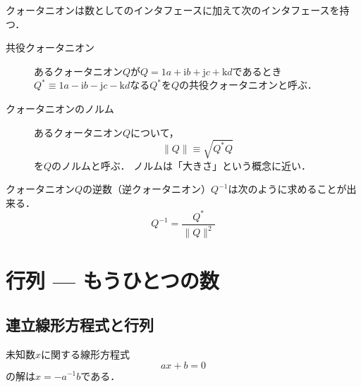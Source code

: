 \documentclass{jsbook}
\newcommand{\zero}{0}%
\newcommand{\one}{1}%
\newcommand{\ii}{\mathrm{i}}%
\newcommand{\jj}{\mathrm{j}}%
\newcommand{\kk}{\mathrm{k}}%
\newcommand{\norm}[1]{\|{#1}\|}
\begin{document}
クォータニオンは数としてのインタフェースに加えて次のインタフェースを持つ．
\begin{description}
\item[共役クォータニオン] あるクォータニオン$Q$が$Q=\one a+\ii b+\jj c+\kk d$であるとき$Q^*\equiv\one a-\ii b-\jj c-\kk d$なる$Q^*$を$Q$の共役クォータニオンと呼ぶ．
\item[クォータニオンのノルム] あるクォータニオン$Q$について，
\begin{equation}\norm{Q}\equiv\sqrt{Q^*Q}
\end{equation}
を$Q$のノルムと呼ぶ．
ノルムは「大きさ」という概念に近い．
\end{description}

クォータニオン$Q$の逆数（逆クォータニオン）$Q^{-1}$は次のように求めることが出来る．
\begin{equation}
Q^{-1}=\frac{Q^*}{\norm{Q}^2}
\end{equation}

\section{行列 --- もうひとつの数}

\subsection{連立線形方程式と行列}

未知数$x$に関する線形方程式
\begin{equation}
ax+b=\zero
\end{equation}
の解は$x=-a^{-1}b$である．
\end{document}
